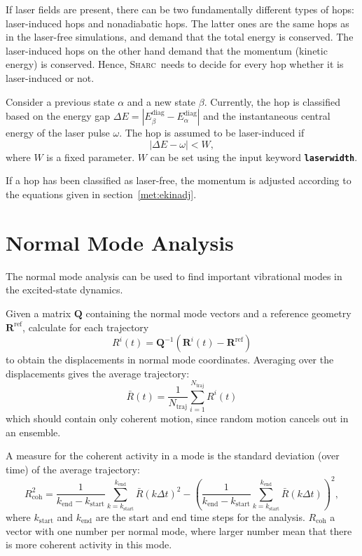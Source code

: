 \documentclass[a4paper,10pt,DIV=15,openany,twoside=false]{scrbook}
\newcommand{\sharc}{\textsc{Sharc}}
\newcommand{\ttt}[1]{\textbf{\texttt{#1}}}
\newcommand{\VEC}[1]{\ensuremath{\mathbf{#1}}}
\begin{document}
If laser fields are present, there can be two fundamentally different types of hops: laser-induced hops and nonadiabatic hops. The latter ones are the same hops as in the laser-free simulations, and demand that the total energy is conserved. The laser-induced hops on the other hand demand that the momentum (kinetic energy) is conserved. Hence, \sharc\ needs to decide for every hop whether it is laser-induced or not. 

Consider a previous state $\alpha$ and a new state $\beta$. Currently, the hop is classified based on the energy gap $\Delta E=|E_\beta^\text{diag}-E_\alpha^\text{diag}|$ and the instantaneous central energy of the laser pulse $\omega$. 
The hop is assumed to be laser-induced if
\begin{equation}
  |\Delta E-\omega| < W,
\end{equation}
where $W$ is a fixed parameter. $W$ can be set using the input keyword \ttt{laserwidth}.

If a hop has been classified as laser-free, the momentum is adjusted according to the equations given in section~\ref{met:ekinadj}.



\section{Normal Mode Analysis}\label{met:nma}

The normal mode analysis can be used to find important vibrational modes in the excited-state dynamics.\cite{Kurtz2001JCP,Plasser2009}

Given a matrix $\VEC{Q}$ containing the normal mode vectors and a reference geometry $\VEC{R}^\text{ref}$, calculate for each trajectory
\begin{equation}
  R^i(t)=\VEC{Q}^{-1}(\VEC{R}^i(t)-\VEC{R}^\text{ref})
\end{equation}
to obtain the displacements in normal mode coordinates.
Averaging over the displacements gives the average trajectory:
\begin{equation}
  \bar{R}(t)=\frac{1}{N_\text{traj}}
  \sum_{i=1}^{N_\text{traj}} R^i(t)
\end{equation}
which should contain only coherent motion, since random motion cancels out in an ensemble.

A measure for the coherent activity in a mode is the standard deviation (over time) of the average trajectory:
\begin{equation}
  R_\text{coh}^2=
  \frac{1}{k_\text{end}-k_\text{start}}
  \sum_{k=k_\text{start}}^{k_\text{end}} \bar{R}(k\Delta t)^2
  -
  \left(
  \frac{1}{k_\text{end}-k_\text{start}}
  \sum_{k=k_\text{start}}^{k_\text{end}} \bar{R}(k\Delta t)
  \right)^2,
\end{equation}
where $k_\text{start}$ and $k_\text{end}$ are the start and end time steps for the analysis.
$R_\text{coh}$ a vector with one number per normal mode, where larger number mean that there is more coherent activity in this mode.
\end{document}
